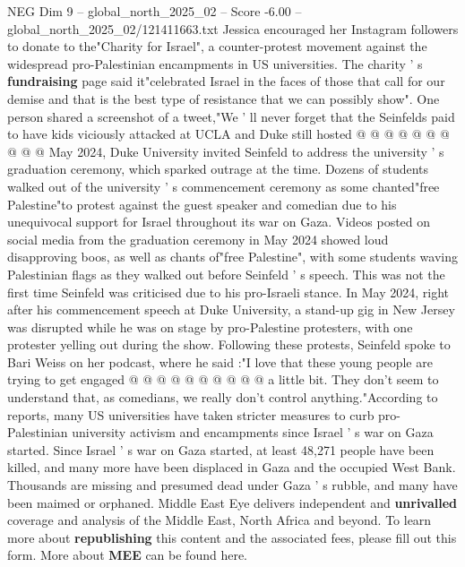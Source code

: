\begin{textsample}{NEG Dim 9 – global\_north\_2025\_02 – Score -6.00 – global\_north\_2025\_02/121411663.txt}
Jessica encouraged her Instagram followers to donate to the"Charity for Israel", a counter-protest movement against the widespread pro-Palestinian encampments in US universities.
The charity ' s \textbf{fundraising} page said it"celebrated Israel in the faces of those that call for our demise and that is the best type of resistance that we can possibly show".
One person shared a screenshot of a tweet,"We ' ll never forget that the Seinfelds paid to have kids viciously attacked at UCLA and Duke still hosted @ @ @ @ @ @ @ @ @ @ May 2024, Duke University invited Seinfeld to address the university ' s graduation ceremony, which sparked outrage at the time.
Dozens of students walked out of the university ' s commencement ceremony as some chanted"free Palestine"to protest against the guest speaker and comedian due to his unequivocal support for Israel throughout its war on Gaza.
Videos posted on social media from the graduation ceremony in May 2024 showed loud disapproving boos, as well as chants of"free Palestine", with some students waving Palestinian flags as they walked out before Seinfeld ' s speech.
This was not the first time Seinfeld was criticised due to his pro-Israeli stance.
In May 2024, right after his commencement speech at Duke University, a stand-up gig in New Jersey was disrupted while he was on stage by pro-Palestine protesters, with one protester yelling out during the show.
Following these protests, Seinfeld spoke to Bari Weiss on her podcast, where he said :"I love that these young people are trying to get engaged @ @ @ @ @ @ @ @ @ @ a little bit.
They don't seem to understand that, as comedians, we really don't control anything."According to reports, many US universities have taken stricter measures to curb pro-Palestinian university activism and encampments since Israel ' s war on Gaza started.
Since Israel ' s war on Gaza started, at least 48,271 people have been killed, and many more have been displaced in Gaza and the occupied West Bank.
Thousands are missing and presumed dead under Gaza ' s rubble, and many have been maimed or orphaned.
Middle East Eye delivers independent and \textbf{unrivalled} coverage and analysis of the Middle East, North Africa and beyond.
To learn more about \textbf{republishing} this content and the associated fees, please fill out this form.
More about \textbf{MEE} can be found here.

\end{textsample}
